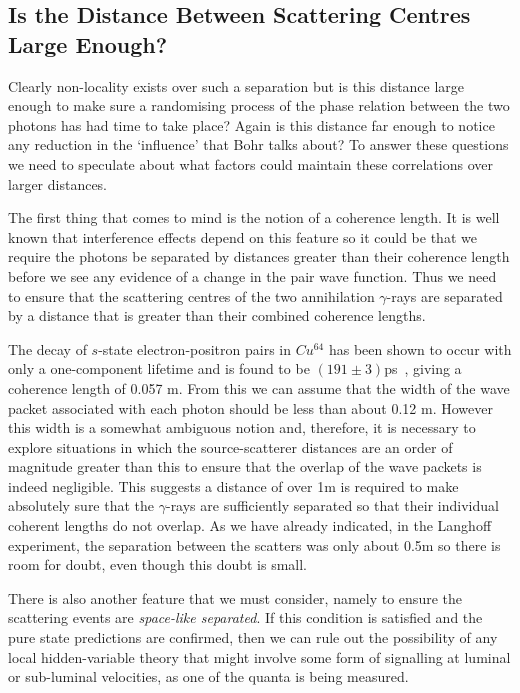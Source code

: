 \documentclass[11pt]{article}
\begin{document}
\subsection{Is the Distance Between Scattering Centres Large Enough?}

Clearly non-locality exists over such a separation but is this distance large enough  to make sure a randomising process of the phase relation between the two photons has had time to take place?  Again is this distance far enough to notice any reduction in the `influence' that Bohr talks about?   To answer these questions we need to speculate about what factors could maintain these correlations over larger distances.


The first thing that comes to mind is the notion of a coherence length.  It is well known that interference effects depend on this feature so it could be that we require the photons be separated by distances greater than their coherence length before we see any evidence of a change in the pair wave function.  Thus we need to ensure that the scattering centres of the two annihilation  $\gamma$-rays are separated by a distance  that is greater than their combined coherence lengths.

The decay of $s$-state electron-positron pairs in  $Cu^{64}$ has been shown to occur with only a one-component lifetime and is found to be $(191 \pm 3)$ps~\cite{phpj71},
giving a coherence length of 0.057 m. From this we can assume that the width of the wave packet associated with each photon should be less than about 0.12 m. However this width is a somewhat ambiguous notion and, therefore, it is necessary to explore situations in which the source-scatterer distances are an order of magnitude greater than this to ensure that the overlap of the wave packets is indeed negligible. This suggests a distance of over 1m is required to make absolutely sure that the $\gamma$-rays are sufficiently separated so that their individual coherent lengths do not overlap.  As we have already indicated, in the Langhoff experiment, the separation between the scatters was only about 0.5m so there is room for doubt, even though this doubt is small.

There is also another feature that we must consider, namely to ensure the  scattering events are {\em space-like separated}.  If this condition is satisfied and the pure state predictions are confirmed, then we can rule out the possibility of any local hidden-variable theory that might involve some form of signalling at luminal or sub-luminal velocities, as one of the quanta is being measured. 
\end{document}
